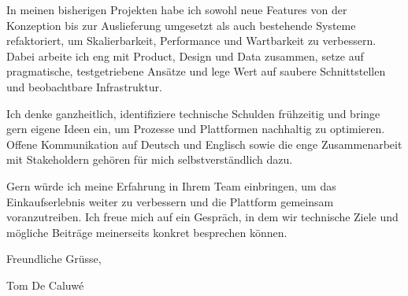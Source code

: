 \documentclass[12pt,a4paper]{letter}
\begin{document}
In meinen bisherigen Projekten habe ich sowohl neue Features von der Konzeption bis zur Auslieferung umgesetzt als auch bestehende Systeme refaktoriert, um Skalierbarkeit, Performance und Wartbarkeit zu verbessern. Dabei arbeite ich eng mit Product, Design und Data zusammen, setze auf pragmatische, testgetriebene Ansätze und lege Wert auf saubere Schnittstellen und beobachtbare Infrastruktur.

Ich denke ganzheitlich, identifiziere technische Schulden frühzeitig und bringe gern eigene Ideen ein, um Prozesse und Plattformen nachhaltig zu optimieren. Offene Kommunikation auf Deutsch und Englisch sowie die enge Zusammenarbeit mit Stakeholdern gehören für mich selbstverständlich dazu.

Gern würde ich meine Erfahrung in Ihrem Team einbringen, um das Einkaufserlebnis weiter zu verbessern und die Plattform gemeinsam voranzutreiben. Ich freue mich auf ein Gespräch, in dem wir technische Ziele und mögliche Beiträge meinerseits konkret besprechen können.

Freundliche Grüsse,

Tom De Caluwé
\end{document}
